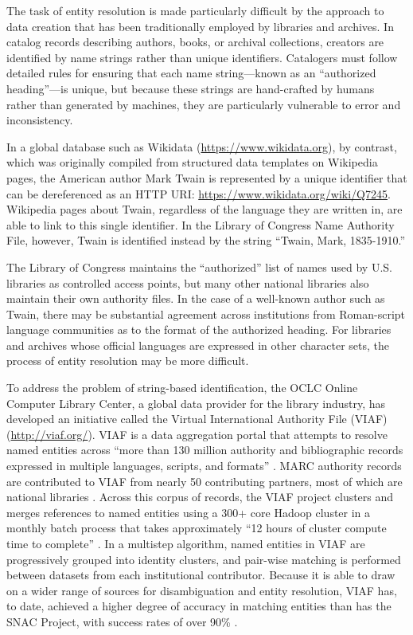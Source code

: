 \documentclass[sigconf]{acmart}
\begin{document}
The task of entity resolution is made particularly difficult by the approach to data creation that has been traditionally employed by libraries and archives. In catalog records describing authors, books, or archival collections, creators are identified by name strings rather than unique identifiers. Catalogers must follow detailed rules for ensuring that each name string---known as an ``authorized heading''---is unique, but because these strings are hand-crafted by humans rather than generated by machines, they are particularly vulnerable to error and inconsistency.

In a global database such as Wikidata (\url{https://www.wikidata.org}), by contrast, which was originally compiled from structured data templates on Wikipedia pages, the American author Mark Twain is represented by a unique identifier that can be dereferenced as an HTTP URI: \url{https://www.wikidata.org/wiki/Q7245}. Wikipedia pages about Twain, regardless of the language they are written in, are able to link to this single identifier. In the Library of Congress Name Authority File, however, Twain is identified instead by the string ``Twain, Mark, 1835-1910.''

The Library of Congress maintains the ``authorized'' list of names used by U.S. libraries as controlled access points, but many other national libraries also maintain their own authority files. In the case of a well-known author such as Twain, there may be substantial agreement across institutions from Roman-script language communities as to the format of the authorized heading. For libraries and archives whose official languages are expressed in other character sets, the process of entity resolution may be more difficult.

To address the problem of string-based identification, the OCLC Online Computer Library Center, a global data provider for the library industry, has developed an initiative called the Virtual International Authority File (VIAF) (\url{http://viaf.org/}). VIAF is a data aggregation portal that attempts to resolve named entities across ``more than 130 million authority and bibliographic records expressed in multiple languages, scripts, and formats'' \cite[p.~1]{tH14}. MARC authority records are contributed to VIAF from nearly 50 contributing partners, most of which are national libraries \cite{tH14}. Across this corpus of records, the VIAF project clusters and merges references to named entities using a 300+ core Hadoop cluster in a monthly batch process that takes approximately ``12 hours of cluster compute time to complete'' \cite[p.~2]{tH14}. In a multistep algorithm, named entities in VIAF are progressively grouped into identity clusters, and pair-wise matching is performed between datasets from each institutional contributor. Because it is able to draw on a wider range of sources for disambiguation and entity resolution, VIAF has, to date, achieved a higher degree of accuracy in matching entities than has the SNAC Project, with success rates of over 90\% \cite{tH14}.
\end{document}
